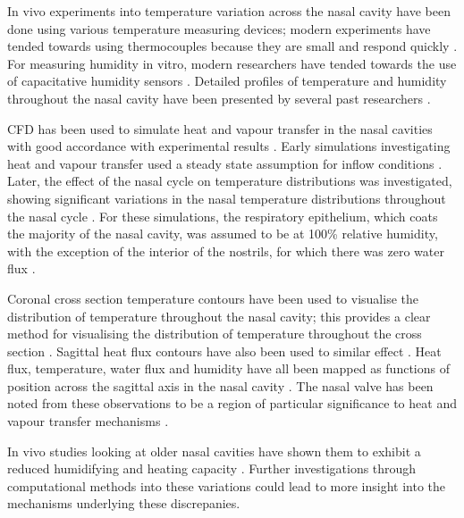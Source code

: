 In vivo experiments into temperature variation across the nasal cavity have been done using various temperature measuring devices; modern experiments have tended towards using thermocouples because they are small and respond quickly \cite{Elad2008}. For measuring humidity in vitro, modern researchers have tended towards the use of capacitative humidity sensors \cite{Keck2000}. Detailed profiles of temperature and humidity throughout the nasal cavity have been presented by several past researchers \cite{Keck2000}. 

CFD has been used to simulate heat and vapour transfer in the nasal cavities with good accordance with experimental results \cite{Lindemann2004}. Early simulations investigating heat and vapour transfer used a steady state assumption for inflow conditions \cite{Naftali1998}. Later, the effect of the nasal cycle on temperature distributions was investigated, showing significant variations in the nasal temperature distributions throughout the nasal cycle \cite{Elad2006}. For these simulations, the respiratory epithelium, which coats the majority of the nasal cavity, was assumed to be at 100\% relative humidity, with the exception of the interior of the nostrils, for which there was zero water flux \cite{Elad2006}.

Coronal cross section temperature contours have been used to visualise the distribution of temperature throughout the nasal cavity; this provides a clear method for visualising the distribution of temperature throughout the cross section \cite{Naftali2005}. Sagittal heat flux contours have also been used to similar effect \cite{Sullivan2013}. Heat flux, temperature, water flux and humidity have all been mapped as functions of position across the sagittal axis in the nasal cavity \cite{Garcia2007, Sullivan2013, Yu2014}. The nasal valve has been noted from these observations to be a region of particular significance to heat and vapour transfer mechanisms \cite{Sullivan2013}. 

In vivo studies looking at older nasal cavities have shown them to exhibit a reduced humidifying and heating capacity \cite{Lindemann2008}. Further investigations through computational methods into these variations could lead to more insight into the mechanisms underlying these discrepanies.

